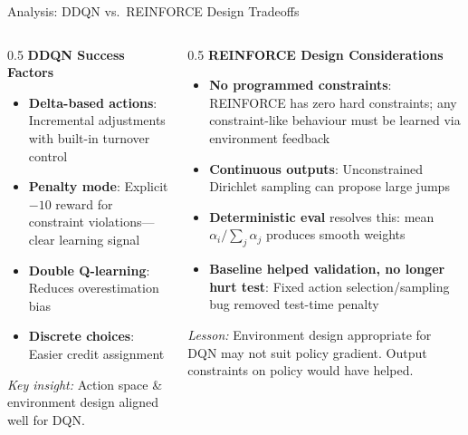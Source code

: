 \documentclass[aspectratio=169]{beamer}
\begin{document}
\begin{frame}{Analysis: DDQN vs.\ REINFORCE Design Tradeoffs}
\small

\begin{columns}[T,totalwidth=\textwidth]
\begin{column}{0.5\textwidth}
\textbf{DDQN Success Factors}
\begin{itemize}\setlength{\itemsep}{4pt}
  \item \textbf{Delta-based actions}: Incremental adjustments with built-in turnover control~\citep{lucarelli2020dqlcrypto}
  \item \textbf{Penalty mode}: Explicit $-10$ reward for constraint violations---clear learning signal
  \item \textbf{Double Q-learning}: Reduces overestimation bias~\citep{vanHasselt2016ddqn}
  \item \textbf{Discrete choices}: Easier credit assignment
\end{itemize}

\vspace{0.3em}
\textit{Key insight:} Action space \& environment design aligned well for DQN.
\end{column}

\begin{column}{0.5\textwidth}
\textbf{REINFORCE Design Considerations}
\begin{itemize}\setlength{\itemsep}{4pt}
  \item \textbf{No programmed constraints}: REINFORCE has zero hard constraints; any constraint-like behaviour must be learned via environment feedback
  \item \textbf{Continuous outputs}: Unconstrained Dirichlet sampling can propose large jumps
  \item \textbf{Deterministic eval} resolves this: mean $\alpha_i/\sum_j\alpha_j$ produces smooth weights
  \item \textbf{Baseline helped validation, no longer hurt test}: Fixed action selection/sampling bug removed test-time penalty
\end{itemize}

\vspace{0.3em}
\textit{Lesson:} Environment design appropriate for DQN may not suit policy gradient. Output constraints on policy would have helped.
\end{column}
\end{columns}

\end{frame}
\end{document}
